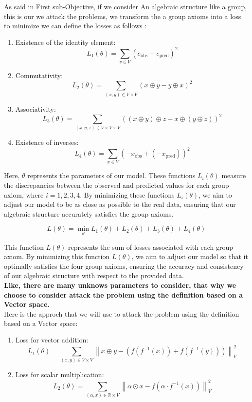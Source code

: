 \documentclass{report}
\begin{document}
    As said in  First sub-Objective, if we consider An algebraic structure like a group, this is our we attack the problems, we transform the a group axioms into a loss to minimize we can define the losses as follows : 

    \begin{enumerate}
        \item Existence of the identity element:  \[
            L_1(\theta) = \sum_{v \in V} (e_{\text{obs}} - e_{\text{pred}})^2
            \]
        \item Commutativity:
        \[
        L_2(\theta) = \sum_{(x, y) \in V \times V} (x \oplus y - y \oplus x)^2
        \]
        \item Associativity:
        \[
        L_3(\theta) = \sum_{(x, y, z) \in V \times V \times V} ((x \oplus y) \oplus z - x \oplus (y \oplus z))^2
        \]
        \item Existence of inverses:
        \[
        L_4(\theta) = \sum_{x \in V} (-x_{\text{obs}} + (-x_{\text{pred}}))^2
        \] 
    \end{enumerate}
    
    Here, $\theta$ represents the parameters of our model.
    These functions $L_i(\theta)$ measure the discrepancies
    between the observed and predicted values for each group 
    axiom, where $i = 1, 2, 3, 4$. By minimizing these functions
    $L_i(\theta)$, we aim to adjust our model to be as close as
    possible to the real data, ensuring that our algebraic 
    structure accurately satisfies the group axioms. 

    $$
    L(\theta) = \min_{\theta} L_1(\theta) + L_2(\theta) + L_3(\theta) + L_4(\theta)
    $$


    This function $L(\theta)$ represents the sum of losses 
    associated with each group axiom. By minimizing 
    this function $L(\theta)$, we aim to adjust our model so
    that it optimally satisfies the four group axioms, 
    ensuring the accuracy and consistency of our 
    algebraic structure with respect to the provided data.\\

    \textbf{Like, there are many unknows parameters to consider, that why we choose to consider attack the problem using the definition based on a Vector space.}\\

    
    Here is the approch that we will use to attack the problem using the definition based on a Vector space:


    \begin{enumerate}
        \item Loss for vector addition:
        \[
            L_1(\theta) = \sum_{(x, y) \in V \times V} \left\lVert x \oplus y - \left(f(f^{-1}(x)) + f(f^{-1}(y))\right) \right\rVert_{V}^2
        \]
        \item Loss for scalar multiplication:
        \[
            L_2(\theta) = \sum_{(\alpha, x) \in \mathbb{R} \times V} \left\lVert \alpha \odot x - f(\alpha \cdot f^{-1}(x)) \right\rVert_{V}^2
        \]
    \end{enumerate}
\end{document}
